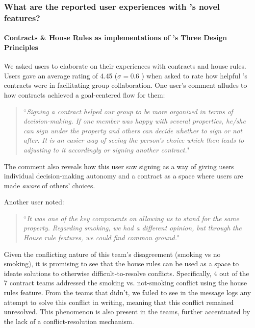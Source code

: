 \subsubsection{What are the reported user experiences with \tool's novel features?}
\label{sssection:novel-features}

\paragraph{Contracts \& House Rules as implementations of \tool's Three Design Principles}
We asked \tool users to elaborate on their experiences with contracts and house rules. Users gave an average rating of 4.45 ($\sigma = 0.6$ ) when asked to rate how helpful \tool's contracts were in facilitating group collaboration.
One user's comment alludes to how contracts achieved a goal-centered flow for them: 
\begin{quote}
``\textit{Signing a contract helped our group to be more organized in terms of decision-making. If one member was happy with several properties, he/she can sign under the property and others can decide whether to sign or not after. It is an easier way of seeing the person’s choice which then leads to adjusting to it accordingly or signing another contract.}"
\end{quote}
The comment also reveals how this user saw signing as a way of giving users individual decision-making autonomy and a contract as a space where users are made \textit{aware} of others' choices.

Another user noted:
\begin{quote}
``\textit{It was one of the key components on allowing us to stand for the same property. Regarding
smoking, we had a different opinion, but through the House rule features, we could find common ground.}"
\end{quote}
Given the conflicting nature of this team’s disagreement (smoking vs no smoking), it is promising to see that
the house rules can be used as a space to ideate solutions to otherwise difficult-to-resolve conflicts. Specifically, 4 out of the 7 contract teams addressed the smoking vs. not-smoking conflict using the house rules feature. From the teams that didn't, we failed to see in the message logs any attempt to solve this conflict in writing, meaning that this conflict remained unresolved. This phenomenon is also present in the \baseline teams, further accentuated by the lack of a conflict-resolution mechanism.

